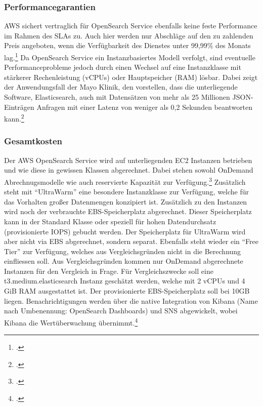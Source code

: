 


\subsubsection{Performancegarantien}
\ac{AWS} sichert vertraglich für OpenSearch Service ebenfalls keine feste Performance im Rahmen des \acp{SLA} zu. Auch hier werden nur Abschläge auf den zu zahlenden Preis angeboten, wenn die Verfügbarkeit des Dienstes unter 99,99\% des Monats lag.\footcite[Vgl.][]{AmazonWebServicesInc..2019} Da OpenSearch Service ein Instanzbasiertes Modell verfolgt, sind eventuelle Performanceprobleme jedoch durch einen Wechsel auf eine Instanzklasse mit stärkerer Rechenleistung (vCPUs) oder Hauptspeicher (\ac{RAM}) lösbar. Dabei zeigt der Anwendungsfall der Mayo Klinik, den \citeauthor{Chen.2017} vorstellen, dass die unterliegende Software, Elasticsearch, auch mit Datensätzen von mehr als 25 Millionen \ac{JSON}-Einträgen Anfragen mit einer Latenz von weniger als 0,2 Sekunden beantworten kann.\footcite[Vgl.][]{Chen.2017}

\subsubsection{Gesamtkosten}
Der \ac{AWS} OpenSearch Service wird auf unterliegenden \ac{EC2} Instanzen betrieben und wie diese in gewissen Klassen abgerechnet. Dabei stehen sowohl OnDemand Abrechnugsmodelle wie auch reservierte Kapazität zur Verfügung.\footcite[Vgl. auch im Folgenden][]{AmazonWebServicesInc..o.J.w} Zusätzlich steht mit \enquote{UltraWarm} eine besondere Instanzklasse zur Verfügung, welche für das Vorhalten großer Datenmengen konzipiert ist. Zusätzlich zu den Instanzen wird noch der verbrauchte \ac{EBS}-Speicherplatz abgerechnet. Dieser Speicherplatz kann in der Standard Klasse oder speziell für hohen Datendurchsatz (provisionierte \ac{IOPS}) gebucht werden. Der Speicherplatz für UltraWarm wird aber nicht via \ac{EBS} abgerechnet, sondern separat. Ebenfalls steht wieder ein \enquote{Free Tier} zur Verfügung, welches aus Vergleichsgründen nicht in die Berechnung einfliessen soll. Aus Vergleichsgründen kommen nur OnDemand abgerechnete Instanzen für den Vergleich in Frage. Für Vergleichszwecke soll eine t3.medium.elasticsearch Instanz geschätzt werden, welche mit 2 vCPUs und 4 GiB \ac{RAM} ausgestattet ist. Der provisionierte \ac{EBS}-Speicherplatz soll bei 10GB liegen.
Benachrichtigungen werden über die native Integration von Kibana (Name nach Umbenennung: OpenSearch Dashboards) und \ac{SNS} abgewickelt, wobei Kibana die Wertüberwachung übernimmt.\footcite[Vgl.][]{AmazonWebServicesInc..o.J.x}

